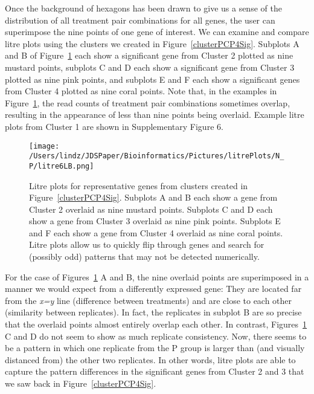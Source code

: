 \documentclass{bioinfo}
\begin{document}
Once the background of hexagons has been drawn to give us a sense of the distribution of all treatment pair combinations for all genes, the user can superimpose the nine points of one gene of interest. We can examine and compare litre plots using the clusters we created in Figure~\ref{clusterPCP4Sig}. Subplots A and B of Figure~\ref{repDot} each show a significant gene from Cluster 2 plotted as nine mustard points, subplots C and D each show a significant gene from Cluster 3 plotted as nine pink points, and subplots E and F each show a significant genes from Cluster 4 plotted as nine coral points. Note that, in the examples in Figure~\ref{repDot}, the read counts of treatment pair combinations sometimes overlap, resulting in the appearance of less than nine points being overlaid. Example litre plots from Cluster 1 are shown in Supplementary Figure 6.

\begin{figure}[!tpb]
\centerline{\texttt{[image: /Users/lindz/JDSPaper/Bioinformatics/Pictures/litrePlots/N\_P/litre6LB.png]}}
\caption{Litre plots for representative genes from clusters created in Figure~\ref{clusterPCP4Sig}. Subplots A and B each show a gene from Cluster 2 overlaid as nine mustard points. Subplots C and D each show a gene from Cluster 3 overlaid as nine pink points. Subplots E and F each show a gene from Cluster 4 overlaid as nine coral points. Litre plots allow us to quickly flip through genes and search for (possibly odd) patterns that may not be detected numerically.
\label{repDot}}
\end{figure}

For the case of Figures~\ref{repDot} A and B, the nine overlaid points are superimposed in a manner we would expect from a differently expressed gene: They are located far from the \textit{x=y} line (difference between treatments) and are close to each other (similarity between replicates). In fact, the replicates in subplot B are so precise that the overlaid points almost entirely overlap each other. In contrast, Figures~\ref{repDot} C and D do not seem to show as much replicate consistency. Now, there seems to be a pattern in which one replicate from the P group is larger than (and visually distanced from) the other two replicates. In other words, litre plots are able to capture the pattern differences in the significant genes from Cluster 2 and 3 that we saw back in Figure~\ref{clusterPCP4Sig}.
\end{document}
